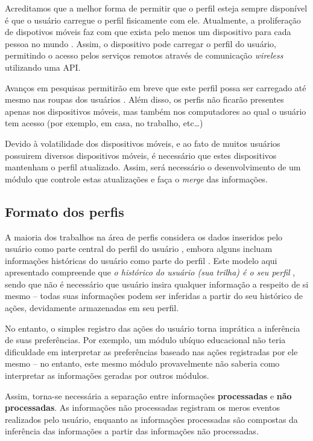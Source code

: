 \documentclass[a4paper, twocolumn]{article}
\begin{document}
Acreditamos que a melhor forma de permitir que o perfil esteja sempre disponível é que o usuário carregue o perfil fisicamente com ele. Atualmente, a proliferação de dispotivos móveis faz com que exista pelo menos um dispositivo para cada pessoa no mundo \cite{bbc10}. Assim, o dispositivo pode carregar o perfil do usuário, permitindo o acesso pelos serviços remotos através de comunicação \emph{wireless} utilizando uma API.

Avanços em pesquisas permitirão em breve que este perfil possa ser carregado até mesmo nas roupas dos usuários \cite{starner96}. Além disso, os perfis não ficarão presentes apenas nos dispositivos móveis, mas também nos computadores ao qual o usuário tem acesso (por exemplo, em casa, no trabalho, etc\ldots)

Devido à volatilidade dos dispositivos móveis, e ao fato de muitos usuários possuirem diversos dispositivos móveis, é necessário que estes dispositivos mantenham o perfil atualizado. Assim, será necessário o desenvolvimento de um módulo que controle estas atualizações e faça o \emph{merge} das informações.


\subsection{Formato dos perfis} \label{sec:formato}

A maioria dos trabalhos na área de perfis considera os dados inseridos pelo usuário como parte central do perfil do usuário \cite{??}, embora alguns incluam informações históricas do usuário como parte do perfil \cite{??}. Este modelo aqui apresentado compreende que \emph{o histórico do usuário (sua trilha) é o seu perfil} \cite{??}, sendo que não é necessário que usuário insira qualquer informação a respeito de si mesmo -- todas suas informações podem ser inferidas a partir do seu histórico de ações, devidamente armazenadas em seu perfil.

No entanto, o simples registro das ações do usuário torna imprática a inferência de suas preferências. Por exemplo, um módulo ubíquo educacional não teria dificuldade em interpretar as preferências baseado nas ações registradas por ele mesmo -- no entanto, este mesmo módulo provavelmente não saberia como interpretar as informações geradas por outros módulos.

Assim, torna-se necessária a separação entre informações \textbf{processadas} e \textbf{não processadas}. As informações não processadas registram os meros eventos realizados pelo usuário, enquanto as informações processadas são compostas da inferência das informações a partir das informações não processadas.
\end{document}
